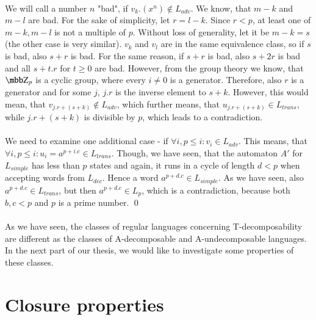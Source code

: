 \paragraph{}
We will call a number $n$ "bad", if $v_k.(x^{n}) \notin L_{adv}$. We know, that $m-k$ and $m-l$ are bad. For the sake of simplicity, let $r = l-k$. Since $r < p$, at least one of $m-k, m-l$ is not a multiple of $p$. Without loss of generality, let it be $m-k = s$ (the other case is very similar). $v_k$ and $v_l$ are in the same equivalence class, so if $s$ is bad, also $s+r$ is bad. For the same reason, if $s+r$ is bad, also $s+2r$ is bad and all $s+t.r$ for $t \geq 0$ are bad. However, from the group theory we know, that $\Z_p$ is a cyclic group, where every $i \neq 0$ is a generator. Therefore, also $r$ is a generator and for some $j$, $j.r$ is the inverse element to $s+k$. However, this would mean, that $v_{j.r+(s+k)} \notin L_{adv}$, which further means, that $u_{j.r+(s+k)} \in L_{trans}$, while $j.r+(s+k)$ is divisible by $p$, which leads to a contradiction.

\paragraph{}
We need to examine one additional case - if $\forall i, p \leq i: v_i \in L_{adv}$. This means, that $\forall i, p\leq i: u_i = a^{p+i.c} \in L_{trans}$. Though, we have seen, that the automaton $A'$ for $L_{simple}$ has less than $p$ states and again, it runs in a cycle of length $d < p$ when accepting words from $L_{dec}$. Hence a word $a^{p+d.c} \in L_{simple}$. As we have seen, also $a^{p+d.c} \in L_{trans}$, but then $a^{p+d.c} \in L_p$, which is a contradiction, because both $b,c<p$ and $p$ is a prime number. \qed

\paragraph{}
As we have seen, the classes of regular languages concerning T-decomposability are different as the classes of A-decomposable and A-undecomposable languages. In the next part of our thesis, we would like to investigate some properties of these classes.

\section{Closure properties}


